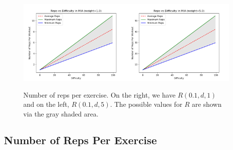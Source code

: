 \begin{figure}[h]
	\centering
	\includegraphics[width=0.5\textwidth]{images/Rvd1.png}\includegraphics[width=0.5\textwidth]{images/Rvd5.png}
	\caption{Number of reps per exercise. On the right, we have $R(0.1,d,1)$ and on the left, $R(0.1,d,5)$. The possible values for $R$ are shown via the gray shaded area.} \label{Rvd}
\end{figure}


\subsection{Number of Reps Per Exercise}

